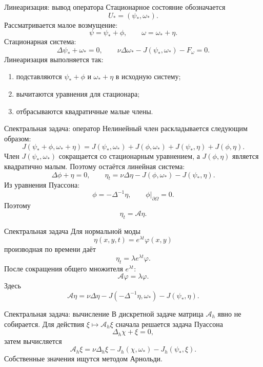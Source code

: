 \documentclass[aspectratio=169,10pt]{beamer}
\newcommand{\Laplace}{\Delta}
\newcommand{\J}{J}
\begin{document}
\begin{frame}{Линеаризация: вывод оператора}
    Стационарное состояние обозначается
    \[
        U_*=(\psi_*,\omega_*).
    \]
    Рассматривается малое возмущение:
    \[
        \psi=\psi_*+\phi,\qquad
        \omega=\omega_*+\eta.
    \]
    Стационарная система:
    \[
        \Laplace\psi_*+\omega_*=0,
        \qquad
        \nu\Laplace\omega_*-\J(\psi_*,\omega_*)-F_\omega=0.
    \]
    Линеаризация выполняется так:
    \begin{enumerate}
        \item подставляются \(\psi_*+\phi\) и \(\omega_*+\eta\) в исходную систему;
        \item вычитаются уравнения для стационара;
        \item отбрасываются квадратичные малые члены.
    \end{enumerate}
\end{frame}

\begin{frame}{Спектральная задача: оператор}
    Нелинейный член раскладывается следующим образом:
    \[
        \J(\psi_*+\phi,\omega_*+\eta)
        =
        \J(\psi_*,\omega_*)
        +
        \J(\phi,\omega_*)
        +
        \J(\psi_*,\eta)
        +
        \J(\phi,\eta).
    \]
    Член \(\J(\psi_*,\omega_*)\) сокращается со стационарным уравнением, а \(\J(\phi,\eta)\) является квадратично малым.
    Поэтому остаётся линейная система:
    \[
        \Laplace\phi+\eta=0,
        \qquad
        \eta_t
        =
        \nu\Laplace\eta
        -
        \J(\phi,\omega_*)
        -
        \J(\psi_*,\eta).
    \]
    Из уравнения Пуассона:
    \[
        \phi=-\Laplace^{-1}\eta,
        \qquad
        \phi|_{\partial\Omega}=0.
    \]
    Поэтому
    \[
        \eta_t=\mathcal A\eta.
    \]
\end{frame}

\begin{frame}{Спектральная задача}
    Для нормальной моды
    \[
        \eta(x,y,t)=e^{\lambda t}\varphi(x,y)
    \]
    производная по времени даёт
    \[
        \eta_t=\lambda e^{\lambda t}\varphi.
    \]
    После сокращения общего множителя \(e^{\lambda t}\):
    \[
        \mathcal A\varphi=\lambda\varphi.
    \]
    Здесь
    \[
        \mathcal A\eta
        =
        \nu\Laplace\eta
        -
        \J(-\Laplace^{-1}\eta,\omega_*)
        -
        \J(\psi_*,\eta).
    \]
\end{frame}

\begin{frame}{Спектральная задача: вычисление}
    В дискретной задаче матрица \(\mathcal A_h\) явно не собирается.
    Для действия \(\xi\mapsto\mathcal A_h\xi\) сначала решается задача Пуассона
    \[
        \Laplace_h\chi+\xi=0,
    \]
    затем вычисляется
    \[
        \mathcal A_h\xi
        =
        \nu\Laplace_h\xi
        -
        \J_h(\chi,\omega_*)
        -
        \J_h(\psi_*,\xi).
    \]
    Собственные значения ищутся методом Арнольди.
\end{frame}
\end{document}
